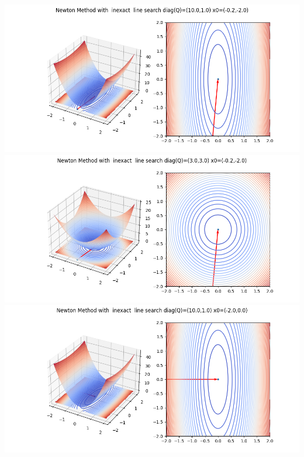 \documentclass{article}
\begin{document}
\includegraphics[scale=0.5]{nm_inexact_1.png}
\includegraphics[scale=0.5]{nm_inexact_2_circle.png}
\includegraphics[scale=0.5]{nm_inexact_3_elipse_easy_start_point.png}
\end{document}
